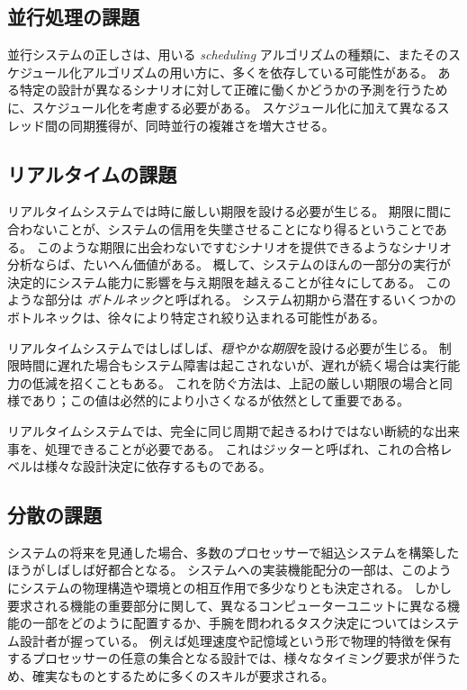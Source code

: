 \documentclass[\pformat,12pt]{jreport}
\begin{document}
\subsection{並行処理の課題}

並行システムの正しさは、用いる \emph{scheduling} アルゴリズムの種類に、またそのスケジュール化アルゴリズムの用い方に、多くを依存している可能性がある。
ある特定の設計が異なるシナリオに対して正確に働くかどうかの予測を行うために、スケジュール化を考慮する必要がある。
スケジュール化に加えて異なるスレッド間の同期獲得が、同時並行の複雑さを増大させる。

\subsection{リアルタイムの課題}

リアルタイムシステムでは時に厳しい期限を設ける必要が生じる。
期限に間に合わないことが、システムの信用を失墜させることになり得るということである。
このような期限に出会わないですむシナリオを提供できるようなシナリオ分析ならば、たいへん価値がある。
概して、システムのほんの一部分の実行が決定的にシステム能力に影響を与え期限を越えることが往々にしてある。
このような部分は \emph{ボトルネック}と呼ばれる。
システム初期から潜在するいくつかのボトルネックは、徐々により特定され絞り込まれる可能性がある。

リアルタイムシステムではしばしば、\emph{穏やかな期限}を設ける必要が生じる。
制限時間に遅れた場合もシステム障害は起こされないが、遅れが続く場合は実行能力の低減を招くこともある。
これを防ぐ方法は、上記の厳しい期限の場合と同様であり；この値は必然的により小さくなるが依然として重要である。

リアルタイムシステムでは、完全に同じ周期で起きるわけではない断続的な出来事を、処理できることが必要である。
これはジッターと呼ばれ、これの合格レベルは様々な設計決定に依存するものである。

\subsection{分散の課題}

システムの将来を見通した場合、多数のプロセッサーで組込システムを構築したほうがしばしば好都合となる。
システムへの実装機能配分の一部は、このようにシステムの物理構造や環境との相互作用で多少なりとも決定される。
しかし要求される機能の重要部分に関して、異なるコンピューターユニットに異なる機能の一部をどのように配置するか、手腕を問われるタスク決定についてはシステム設計者が握っている。
例えば処理速度や記憶域という形で物理的特徴を保有するプロセッサーの任意の集合となる設計では、様々なタイミング要求が伴うため、確実なものとするために多くのスキルが要求される。
\end{document}
